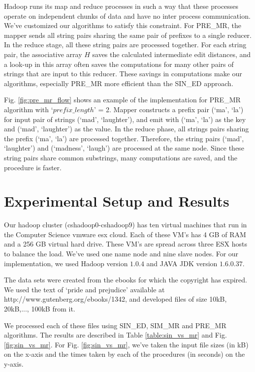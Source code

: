\documentclass[conference]{IEEEtran}
\begin{document}
Hadoop runs its map and reduce processes in such a way that these processes operate on independent chunks of data and have no inter process communication. We've customized our algorithms to satisfy this constraint. For PRE\_MR, the mapper sends all string pairs sharing the same pair of prefixes to a single reducer. In the reduce stage, all these string pairs are processed together. For each string pair, the associative array $H$ saves the calculated intermediate edit distances, and a look-up in this array often saves the computations for many other pairs of strings that are input to this reducer. These savings in computations make our algorithms, especially PRE\_MR more efficient than the SIN\_ED approach.

Fig. \ref{fig:pre_mr_flow} shows an example of the implementation for PRE\_MR algorithm with `$prefix\_length$' = 2. Mapper constructs a prefix pair (`ma', `la') for input pair of strings (`mad', `laughter'), and emit with (`ma', `la') as the key and (`mad', `laughter') as the value. In the reduce phase, all strings pairs sharing the prefix (`ma', `la') are processed together. Therefore, the string pairs (`mad', `laughter') and (`madness', `laugh') are processed at the same node. Since these string pairs share common substrings, many computations are saved, and the procedure is faster.

\section{Experimental Setup and Results}
Our hadoop cluster (cshadoop0-cshadoop9) has ten virtual machines that run in the Computer Science vmware esx cloud. Each of these VM's has 4 GB of RAM and a 256 GB virtual hard drive. These VM's are spread across three ESX hosts to balance the load. We've used one name node and nine slave nodes. For our implementation, we used Hadoop version $1.0.4$ and JAVA JDK version $1.6.0.37$.

The data sets were created from the ebooks for which the copyright has expired. We used the text of `pride and prejudice' available at http://www.gutenberg.org/ebooks/1342, and developed files of size 10kB, 20kB,..., 100kB from it.

We processed each of these files using SIN\_ED, SIM\_MR and PRE\_MR algorithms. The results are described in Table \ref{table:sin_vs_mr} and Fig. \ref{fig:sin_vs_mr}. For Fig. \ref{fig:sin_vs_mr}, we've taken the input file sizes (in kB) on the x-axis and the times taken by each of the procedures (in seconds) on the y-axis.
\end{document}
